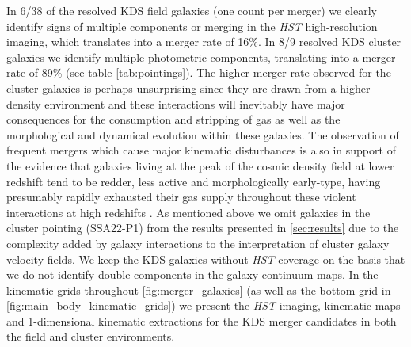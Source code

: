 \documentclass[fleqn,usenatbib]{mn2e}
\begin{document}
In 6/38 of the resolved KDS field galaxies (one count per merger) we clearly identify signs of multiple components or merging in the {\em HST} high-resolution imaging, which translates into a merger rate of 16\%.
In 8/9 resolved KDS cluster galaxies we identify multiple photometric components, translating into a merger rate of 89\%  (see table \ref{tab:pointings}).
The higher merger rate observed for the cluster galaxies is perhaps unsurprising since they are drawn from a higher density environment and these interactions will inevitably have major consequences for the consumption and stripping of gas as well as the morphological and dynamical evolution within these galaxies.
The observation of frequent mergers which cause major kinematic disturbances is also in support of the evidence that galaxies living at the peak of the cosmic density field at lower redshift tend to be redder, less active and morphologically early-type, having presumably rapidly exhausted their gas supply throughout these violent interactions at high redshifts \citep[e.g.][]{Steidel1998,White2007,Kodama2007,Zheng2009}.
As mentioned above we omit galaxies in the cluster pointing (SSA22-P1) from the results presented in \cref{sec:results} due to the complexity added by galaxy interactions to the interpretation of cluster galaxy velocity fields.
We keep the KDS galaxies without {\em HST} coverage on the basis that we do not identify double components in the galaxy continuum maps. 
In the kinematic grids throughout \ref{fig:merger_galaxies} (as well as the bottom grid in \ref{fig:main_body_kinematic_grids}) we present the {\em HST} imaging, kinematic maps and 1-dimensional kinematic extractions for the KDS merger candidates in both the field and cluster environments.
\end{document}
